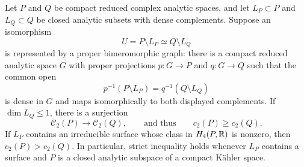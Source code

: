 \begin{lemma}\label{lem:cycle-loss}
Let $P$ and $Q$ be compact reduced complex analytic spaces, and let
$L_P\subset P$ and $L_Q\subset Q$ be closed analytic subsets with
dense complements.  Suppose an isomorphism
\[
 U=P\setminus L_P\simeq Q\setminus L_Q
\]
is represented by a proper bimeromorphic graph: there is a compact
reduced analytic space $G$ with proper projections $p:G\to P$ and
$q:G\to Q$ such that the common open
\begin{equation}\label{eq:cycle-graph-open}
 p^{-1}(P\setminus L_P)=q^{-1}(Q\setminus L_Q)
\end{equation}
is dense in $G$ and maps isomorphically to both displayed complements.
If $\dim L_Q\leq1$, there is a surjection
\[
 \mathcal C_2(P)\longrightarrow\mathcal C_2(Q),
 \qquad\text{and thus}\qquad c_2(P)\geq c_2(Q).
\]
If $L_P$ contains an irreducible surface whose class in $H_4(P,\mathbb R)$ is nonzero,
then $c_2(P)>c_2(Q)$.  In particular, strict inequality holds whenever
$L_P$ contains a surface and $P$ is a closed analytic subspace of a
compact K\"ahler space.
\end{lemma}

